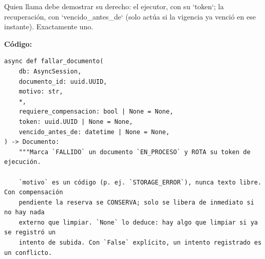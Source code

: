 \documentclass[11pt,a4paper]{article}
\begin{document}
Quien llama debe demostrar su derecho: el ejecutor, con su `token`; la recuperación, con
`vencido\_antes\_de` (solo actúa si la vigencia ya venció en ese instante). Exactamente uno.

\textbf{Código:}
\begin{lstlisting}
async def fallar_documento(
    db: AsyncSession,
    documento_id: uuid.UUID,
    motivo: str,
    *,
    requiere_compensacion: bool | None = None,
    token: uuid.UUID | None = None,
    vencido_antes_de: datetime | None = None,
) -> Documento:
    """Marca `FALLIDO` un documento `EN_PROCESO` y ROTA su token de ejecución.

    `motivo` es un código (p. ej. `STORAGE_ERROR`), nunca texto libre. Con compensación
    pendiente la reserva se CONSERVA; solo se libera de inmediato si no hay nada
    externo que limpiar. `None` lo deduce: hay algo que limpiar si ya se registró un
    intento de subida. Con `False` explícito, un intento registrado es un conflicto.


\end{lstlisting}
\end{document}
